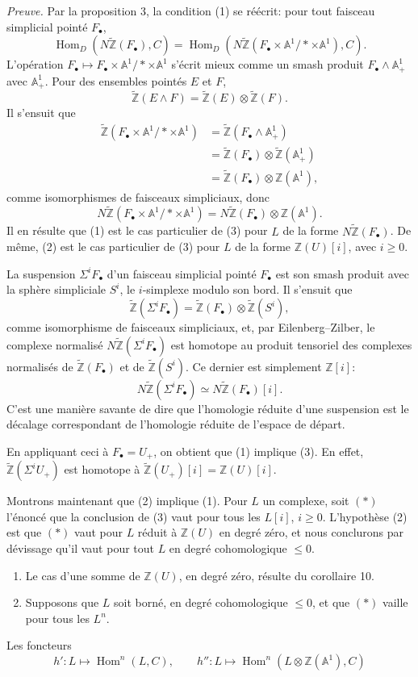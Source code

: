 \documentclass[11pt]{article}
\newcommand{\Aone}{\mathbb A^1}
\newcommand{\Z}{\mathbb Z}
\newcommand{\Hom}{\operatorname{Hom}}
\newcommand{\pt}{*}
\newcommand{\ZZ}{\widetilde{\Z}}
\theoremstyle{deligne}
\begin{document}
\noindent\textit{Preuve.} Par la proposition 3, la condition (1) se réécrit: pour tout faisceau simplicial pointé \(F_\bullet\),
\[
  \Hom_D(N\ZZ(F_\bullet),C)=
  \Hom_D(N\ZZ(F_\bullet\times\Aone/\pt\times\Aone),C).
\]
L'opération \(F_\bullet\mapsto F_\bullet\times\Aone/\pt\times\Aone\) s'écrit mieux comme un smash produit \(F_\bullet\wedge\Aone_+\) avec \(\Aone_+\). Pour des ensembles pointés \(E\) et \(F\),
\[
  \ZZ(E\wedge F)=\ZZ(E)\otimes\ZZ(F).
\]
Il s'ensuit que
\[
\begin{aligned}
\ZZ(F_\bullet\times\Aone/\pt\times\Aone)
&=\ZZ(F_\bullet\wedge\Aone_+)        \\
&=\ZZ(F_\bullet)\otimes\ZZ(\Aone_+) \\
&=\ZZ(F_\bullet)\otimes\Z(\Aone),
\end{aligned}
\]
comme isomorphismes de faisceaux simpliciaux, donc
\[
  N\ZZ(F_\bullet\times\Aone/\pt\times\Aone)
  =N\ZZ(F_\bullet)\otimes\Z(\Aone).
\]
Il en résulte que (1) est le cas particulier de (3) pour \(L\) de la forme \(N\ZZ(F_\bullet)\). De même, (2) est le cas particulier de (3) pour \(L\) de la forme \(\Z(U)[i]\), avec \(i\ge0\).

La suspension \(\Sigma^iF_\bullet\) d'un faisceau simplicial pointé \(F_\bullet\) est son smash produit avec la sphère simpliciale \(S^i\), le \(i\)-simplexe modulo son bord. Il s'ensuit que
\[
  \ZZ(\Sigma^iF_\bullet)=\ZZ(F_\bullet)\otimes\ZZ(S^i),
\]
comme isomorphisme de faisceaux simpliciaux, et, par Eilenberg--Zilber, le complexe normalisé \(N\ZZ(\Sigma^iF_\bullet)\) est homotope au produit tensoriel des complexes normalisés de \(\ZZ(F_\bullet)\) et de \(\ZZ(S^i)\). Ce dernier est simplement \(\Z[i]\):
\[
  N\ZZ(\Sigma^iF_\bullet)\simeq N\ZZ(F_\bullet)[i].
\]
C'est une manière savante de dire que l'homologie réduite d'une suspension est le décalage correspondant de l'homologie réduite de l'espace de départ.

En appliquant ceci à \(F_\bullet=U_+\), on obtient que (1) implique (3). En effet, \(\ZZ(\Sigma^iU_+)\) est homotope à \(\ZZ(U_+)[i]=\Z(U)[i]\).

Montrons maintenant que (2) implique (1). Pour \(L\) un complexe, soit \((*)\) l'énoncé que la conclusion de (3) vaut pour tous les \(L[i]\), \(i\ge0\). L'hypothèse (2) est que \((*)\) vaut pour \(L\) réduit à \(\Z(U)\) en degré zéro, et nous conclurons par dévissage qu'il vaut pour tout \(L\) en degré cohomologique \(\le0\).
\begin{enumerate}[label=(\alph*)]
\item Le cas d'une somme de \(\Z(U)\), en degré zéro, résulte du corollaire 10.
\item Supposons que \(L\) soit borné, en degré cohomologique \(\le0\), et que \((*)\) vaille pour tous les \(L^n\).
\end{enumerate}
Les foncteurs
\[
  h':L\longmapsto \Hom^n(L,C),\qquad
  h'':L\longmapsto \Hom^n(L\otimes\Z(\Aone),C) \tag{3.6}
\]
\end{document}
